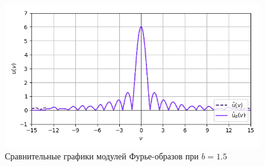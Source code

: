 \documentclass[a4paper]{article}
\begin{document}
\begin{figure}[H]
\begin{minipage}{0.33\textwidth}
        \centering \includegraphics[width=\textwidth]{sources/low-pass filter/fourier (b=1.5, v=13).png}
        \caption{$v = 13$}
    \end{minipage}
    \caption*{Сравнительные графики модулей Фурье-образов при $b=1.5$}
\end{figure}
\end{document}
